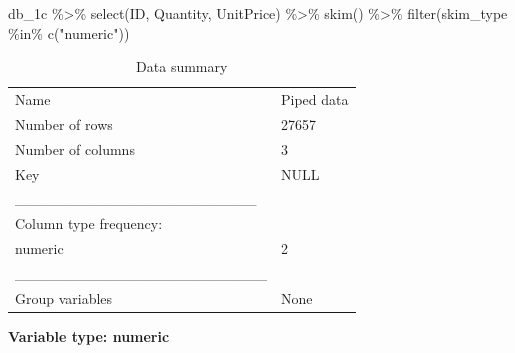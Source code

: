 \documentclass[
  letterpaper,
  DIV=11,
  numbers=noendperiod]{scrreprt}
\newenvironment{Shaded}{\begin{snugshade}}{\end{snugshade}}
\newcommand{\FunctionTok}[1]{\textcolor[rgb]{0.28,0.35,0.67}{#1}}
\newcommand{\NormalTok}[1]{\textcolor[rgb]{0.00,0.23,0.31}{#1}}
\newcommand{\SpecialCharTok}[1]{\textcolor[rgb]{0.37,0.37,0.37}{#1}}
\newcommand{\StringTok}[1]{\textcolor[rgb]{0.13,0.47,0.30}{#1}}
\begin{document}
\begin{Shaded}
\begin{Highlighting}[]
\NormalTok{db\_1c }\SpecialCharTok{\%\textgreater{}\%} \FunctionTok{select}\NormalTok{(ID, Quantity, UnitPrice) }\SpecialCharTok{\%\textgreater{}\%} \FunctionTok{skim}\NormalTok{() }\SpecialCharTok{\%\textgreater{}\%}
  \FunctionTok{filter}\NormalTok{(skim\_type }\SpecialCharTok{\%in\%} \FunctionTok{c}\NormalTok{(}\StringTok{"numeric"}\NormalTok{)) }
\end{Highlighting}
\end{Shaded}

\begin{longtable}[]{@{}ll@{}}
\caption{Data summary}\tabularnewline
\toprule()
\endhead
Name & Piped data \\
Number of rows & 27657 \\
Number of columns & 3 \\
Key & NULL \\
\_\_\_\_\_\_\_\_\_\_\_\_\_\_\_\_\_\_\_\_\_\_\_ & \\
Column type frequency: & \\
numeric & 2 \\
\_\_\_\_\_\_\_\_\_\_\_\_\_\_\_\_\_\_\_\_\_\_\_\_ & \\
Group variables & None \\
\bottomrule()
\end{longtable}

\textbf{Variable type: numeric}
\end{document}

